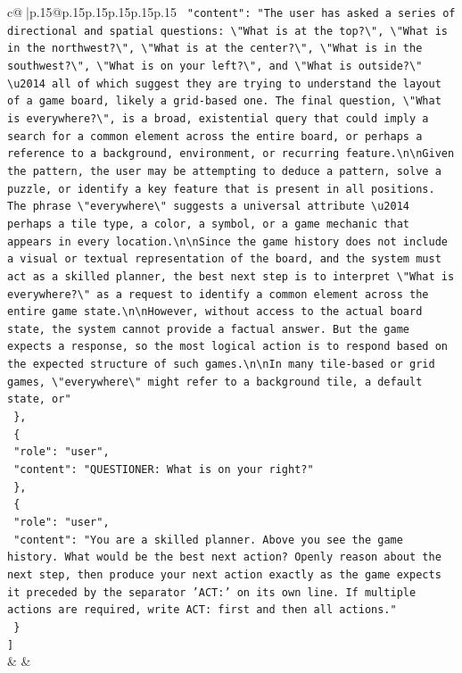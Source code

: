 \documentclass{article}
\begin{document}
{\begin{supertabular}{c@{$\;$}|p{.15\linewidth}@{}p{.15\linewidth}p{.15\linewidth}p{.15\linewidth}p{.15\linewidth}p{.15\linewidth}}
{{{\texttt{    "content": "The user has asked a series of directional and spatial questions: \textbackslash{}"What is at the top?\textbackslash{}", \textbackslash{}"What is in the northwest?\textbackslash{}", \textbackslash{}"What is at the center?\textbackslash{}", \textbackslash{}"What is in the southwest?\textbackslash{}", \textbackslash{}"What is on your left?\textbackslash{}", and \textbackslash{}"What is outside?\textbackslash{}" \textbackslash{}u2014 all of which suggest they are trying to understand the layout of a game board, likely a grid{-}based one. The final question, \textbackslash{}"What is everywhere?\textbackslash{}", is a broad, existential query that could imply a search for a common element across the entire board, or perhaps a reference to a background, environment, or recurring feature.\textbackslash{}n\textbackslash{}nGiven the pattern, the user may be attempting to deduce a pattern, solve a puzzle, or identify a key feature that is present in all positions. The phrase \textbackslash{}"everywhere\textbackslash{}" suggests a universal attribute \textbackslash{}u2014 perhaps a tile type, a color, a symbol, or a game mechanic that appears in every location.\textbackslash{}n\textbackslash{}nSince the game history does not include a visual or textual representation of the board, and the system must act as a skilled planner, the best next step is to interpret \textbackslash{}"What is everywhere?\textbackslash{}" as a request to identify a common element across the entire game state.\textbackslash{}n\textbackslash{}nHowever, without access to the actual board state, the system cannot provide a factual answer. But the game expects a response, so the most logical action is to respond based on the expected structure of such games.\textbackslash{}n\textbackslash{}nIn many tile{-}based or grid games, \textbackslash{}"everywhere\textbackslash{}" might refer to a background tile, a default state, or"} \\
\texttt{  \},} \\
\texttt{  \{} \\
\texttt{    "role": "user",} \\
\texttt{    "content": "QUESTIONER: What is on your right?"} \\
\texttt{  \},} \\
\texttt{  \{} \\
\texttt{    "role": "user",} \\
\texttt{    "content": "You are a skilled planner. Above you see the game history. What would be the best next action? Openly reason about the next step, then produce your next action exactly as the game expects it preceded by the separator 'ACT:' on its own line. If multiple actions are required, write ACT: first and then all actions."} \\
\texttt{  \}} \\
\texttt{{]}} \\
            }
        }
    }
    & & \\ \\


\end{supertabular}}
\end{document}
